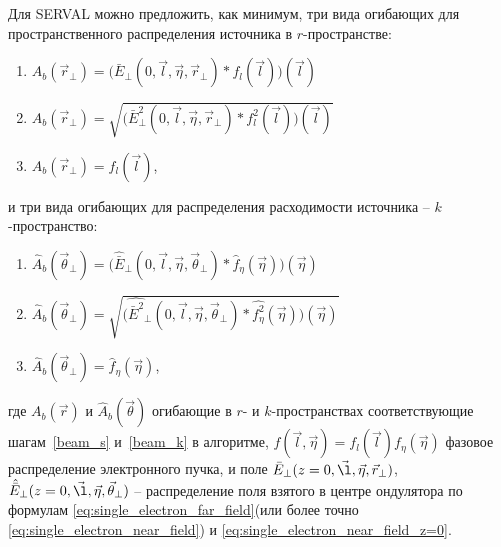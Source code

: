 Для SERVAL можно предложить, как минимум, три вида огибающих для пространственного распределения источника в $r$-пространстве:
\begin{enumerate}[label=\Roman*.]
	\item \label{amplitude} ${A}_{b} (\vec{r}_{\bot}) = \big(\bar{E}_{\bot}(0, \vec{l}, \vec{\eta}, \vec{r}_{\bot}) \ast f_l(\vec{l})\big)(\vec{l})$ \\

	\item \label{intensity} ${A}_{b} (\vec{r}_{\bot}) = \sqrt{\big(\bar{E}^2_{\bot}(0,  \vec{l}, \vec{\eta}, \vec{r}_{\bot}) \ast f_l^2(\vec{l})\big)(\vec{l})}$ \\

	\item \label{e-beam} ${A}_{b} (\vec{r}_{\bot}) = f_l(\vec{l})$,
\end{enumerate}
и три вида огибающих для распределения расходимости источника -- $k$-пространство:
\begin{enumerate}[label=\Roman*.]
	\item \label{amplitude} $\hat{{A}}_{b} (\vec{\theta}_{\bot}) = \big(\hat{\bar{E}}_{\bot}(0,  \vec{l}, \vec{\eta}, \vec{\theta}_{\bot}) \ast \hat{f}_{\eta}(\vec{\eta})\big)(\vec{\eta})$\\
	
	\item \label{intensity} $\hat{{A}}_{b} (\vec{\theta}_{\bot}) = \sqrt{\big(\hat{\bar{E}^2}_{\bot}(0,  \vec{l}, \vec{\eta}, \vec{\theta}_{\bot}) \ast \hat{f_{\eta}^2}(\vec{\eta})\big)(\vec{\eta})}$\\
	
	\item \label{e-beam} $\hat{{A}}_{b} (\vec{\theta}_{\bot}) = \hat{f}_{\eta}(\vec{\eta})$,
\end{enumerate}
где ${A}_{b} (\vec{r})$ и $\hat{{A}}_{b} (\vec{\theta})$ огибающие в $r$- и $k$-пространствах соответствующие шагам~\ref{beam_s} и~\ref{beam_k} в алгоритме,  $f(\vec{l}, \vec{\eta}) = f_l(\vec{l}) f_{\eta}(\vec{\eta})$ фазовое распределение электронного пучка, и поле $\bar{E}_{\bot}(z=0, \vec{\l}, \vec{\eta}, \vec{r}_{\bot})$, $\hat{\bar{E}}_{\bot}(z=0 , \vec{\l}, \vec{\eta}, \vec{\theta}_{\bot})$ -- распределение поля взятого в центре ондулятора по формулам \ref{eq:single_electron_far_field}(или более точно \ref{eq:single_electron_near_field}) и \ref{eq:single_electron_near_field_z=0}.

